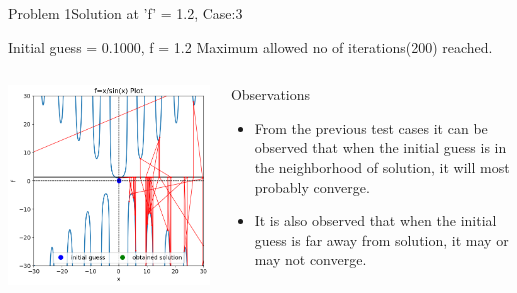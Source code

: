 \documentclass{beamer}
\begin{document}
\begin{frame}{Problem 1}{Solution at 'f' = 1.2, Case:3}
    \begin{block}{\footnotesize Initial guess = 0.1000, f = 1.2}
        \footnotesize
        Maximum allowed no of iterations(200) reached.
    \end{block}
    \vspace{-1.5em}
    \begin{columns}
        \begin{block}{}
            \includegraphics[width=\textwidth]{Figures/prob1_sol31.png}
        \end{block}
        \begin{block}{\footnotesize Observations}
            \footnotesize
            \begin{itemize}
                \item From the previous test cases it can be observed that when the initial guess is in the neighborhood of solution, it will most probably converge. 
                \item It is also observed that when the initial guess is far away from solution, it may or may not converge.
            \end{itemize}
        \end{block}
    \end{columns}
\end{frame}
\end{document}
